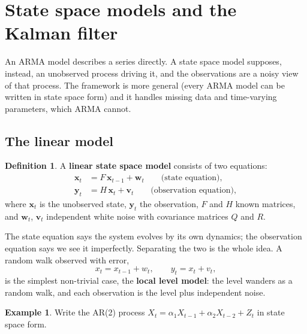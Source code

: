 \documentclass[11pt,a4paper]{article}
\theoremstyle{definition}
\newtheorem{defn}[thm]{Definition}
\newtheorem{exa}[thm]{Example}
\begin{document}
\section{State space models and the Kalman filter}\label{sec:kalman}

An ARMA model describes a series directly. A state space model supposes, instead, an unobserved
process driving it, and the observations are a noisy view of that process. The framework is more general (every ARMA
model can be written in state space form) and it handles missing data and time-varying parameters, which
ARMA cannot.

\subsection{The linear model}

\begin{defn}
A \textbf{linear state space model} consists of two equations:
\begin{align*}
\mathbf{x}_t &= F\,\mathbf{x}_{t-1} + \mathbf{w}_t \qquad\text{(state equation)} , \\
\mathbf{y}_t &= H\,\mathbf{x}_t + \mathbf{v}_t \qquad\text{(observation equation)} ,
\end{align*}
where $\mathbf{x}_t$ is the unobserved state, $\mathbf{y}_t$ the observation, $F$ and $H$ known matrices, and $\mathbf{w}_t$, $\mathbf{v}_t$ independent white noise
with covariance matrices $Q$ and $R$.
\end{defn}

The state equation says the system evolves by its own dynamics; the observation equation says we see it
imperfectly. Separating the two is the whole idea. A random walk observed with error,
\[
x_t = x_{t-1} + w_t , \qquad y_t = x_t + v_t ,
\]
is the simplest non-trivial case, the \textbf{local level model}: the level wanders as a random walk, and each
observation is the level plus independent noise.

\begin{exa}\label{exa:ar2-statespace}
Write the AR(2) process $X_t = \alpha_1X_{t-1} + \alpha_2X_{t-2} + Z_t$ in state space form.
\end{exa}
\end{document}
